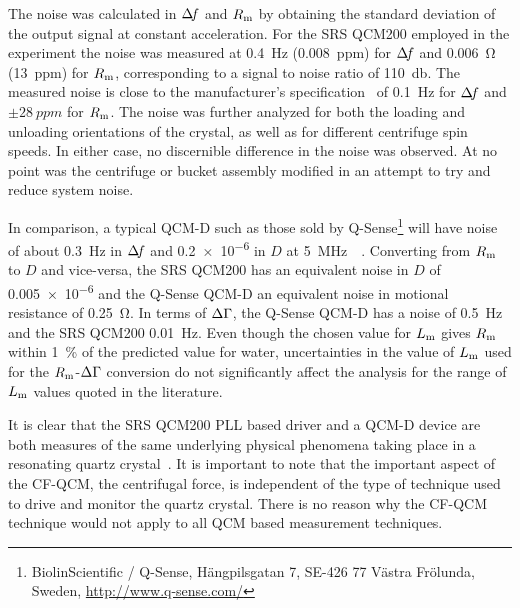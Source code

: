 The noise was calculated in $\Delta\!f$ and $R_\mathrm{m}$ by obtaining the standard
deviation of the output signal at constant acceleration.  For the SRS
QCM200 employed in the experiment the noise was measured at
\SI{0.4}{\hertz} (\SI{0.008}{ppm}) for $\Delta\!f$ and \SI{0.006}{\ohm}
(\SI{13}{ppm}) for $R_\mathrm{m}$, corresponding to a signal to noise ratio of
\SI{110}{\decibel}.  The measured noise is close to the manufacturer's
specification~\cite{srsqcm200manual} of \SI{0.1}{\hertz} for $\Delta\!f$ and
$\pm\SI{28}{ppm}$ for $R_\mathrm{m}$.  The noise was further analyzed for both the
loading and unloading orientations of the crystal, as well as for different
centrifuge spin speeds.  In either case, no discernible difference in the
noise was observed.  At no point was the centrifuge or bucket assembly
modified in an attempt to try and reduce system noise.

In comparison, a typical QCM-D such as those sold by
Q-Sense\footnote{BiolinScientific / Q-Sense, Hängpilsgatan 7, SE-426 77
Västra Frölunda, Sweden,  \url{http://www.q-sense.com/}} will have noise of
about \SI{0.3}{\hertz} in $\Delta\!f$ and \num{0.2e-6} in $D$ at
\SI{5}{\mega\hertz}~\cite{su2005comparison}~\cite{peh2007understanding}.
Converting from $R_\mathrm{m}$ to $D$ and vice-versa, the SRS QCM200 has an
equivalent noise in $D$ of \num{0.005e-6} and the Q-Sense QCM-D an
equivalent noise in motional resistance of \SI{0.25}{\ohm}.  In terms of
$\Delta\Gamma$, the Q-Sense QCM-D has a noise of \SI{0.5}{\hertz} and the SRS QCM200
\SI{0.01}{\hertz}.  Even though the chosen value for $L_\mathrm{m}$ gives $R_\mathrm{m}$
within \SI{1}{\percent} of the predicted value for water, uncertainties in
the value of $L_\mathrm{m}$ used for the $R_\mathrm{m}$-$\Delta\Gamma$ conversion do not significantly
affect the analysis for the range of $L_\mathrm{m}$ values quoted in the literature.

It is clear that the SRS QCM200 PLL based driver and a QCM-D device are
both measures of the same underlying physical phenomena taking place in a
resonating quartz crystal~\cite{geelhood2002transient}.  It is important to
note that the important aspect of the CF-QCM, the centrifugal force, is
independent of the type of technique used to drive and monitor the quartz
crystal.  There is no reason why the CF-QCM technique would not apply to
all QCM based measurement techniques.  

